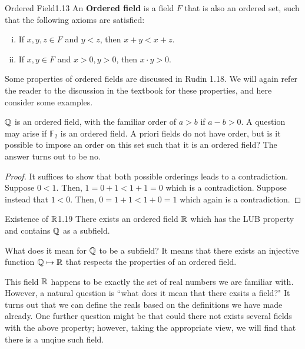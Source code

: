 \setcounter{rudin}{16}
\begin{definition}{Ordered Field}{1.13}
    An \textbf{Ordered field} is a field $F$ that is also an ordered set, such that the following axioms are satisfied:
    \begin{enumerate}[(i)]
        \item If $x, y, z \in F$ and $y < z$, then $x + y < x + z$.
        \item If $x, y \in F$ and $x > 0, y > 0$, then $x\cdot y > 0$.
    \end{enumerate}
\end{definition}
Some properties of ordered fields are discussed in Rudin 1.18. We will again refer the reader to the discussion in the textbook for these properties, and here consider some examples.

$\mathbb{Q}$ is an ordered field, with the familiar order of $a > b$ if $a - b > 0$. A question may arise if $\mathbb{F}_2$ is an ordered field. A priori fields do not have order, but is it possible to impose an order on this set such that it is an ordered field? The answer turns out to be no.

\begin{proof}
    It suffices to show that both possible orderings leads to a contradiction. Suppose $0 < 1$. Then, $1 = 0 + 1 < 1 + 1 = 0$ which is a contradiction. Suppose instead that $1 < 0$. Then, $0 = 1 + 1 < 1 + 0 = 1$ which again is a contradiction.
\end{proof}


\begin{theorem}{Existence of $\mathbb{R}$}{1.19}
    There exists an ordered field $\mathbb{R}$ which has the LUB property and contains $\mathbb{Q}$ as a subfield. 
\end{theorem}
What does it mean for $\mathbb{Q}$ to be a subfield? It means that there exists an injective function $\mathbb{Q} \mapsto \mathbb{R}$ that respects the properties of an ordered field. 

This field $\mathbb{R}$ happens to be exactly the set of real numbers we are familiar with. However, a natural question is ``what does it mean that there exsits a field?" It turns out that we can define the reals based on the definitions we have made already. One further question might be that could there not exists several fields with the above property; however, taking the appropriate view, we will find that there is a unqiue such field. 

